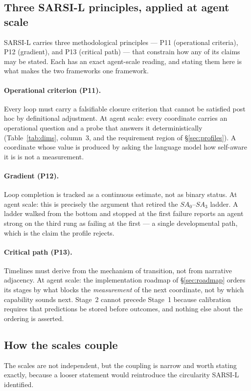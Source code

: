 \documentclass[11pt]{article}
\begin{document}
\subsection{Three SARSI-L principles, applied at agent scale}
\label{sec:principles-applied}
SARSI-L carries three methodological principles --- P11 (operational criteria), P12 (gradient), and P13 (critical path) --- that constrain how any of its claims may be stated. Each has an exact agent-scale reading, and stating them here is what makes the two frameworks one framework.

\paragraph{Operational criterion (P11).} Every loop must carry a falsifiable closure criterion that cannot be satisfied post hoc by definitional adjustment. At agent scale: every coordinate carries an operational question and a probe that answers it deterministically (Table~\ref{tab:dims}, column~3, and the requirement region of \S\ref{sec:profiles}). A coordinate whose value is produced by asking the language model how self-aware it is is not a measurement.

\paragraph{Gradient (P12).} Loop completion is tracked as a continuous estimate, not as binary status. At agent scale: this is precisely the argument that retired the $SA_0$--$SA_3$ ladder. A ladder walked from the bottom and stopped at the first failure reports an agent strong on the third rung as failing at the first --- a single developmental path, which is the claim the profile rejects.

\paragraph{Critical path (P13).} Timelines must derive from the mechanism of transition, not from narrative adjacency. At agent scale: the implementation roadmap of \S\ref{sec:roadmap} orders its stages by what blocks the \emph{measurement} of the next coordinate, not by which capability sounds next. Stage~2 cannot precede Stage~1 because calibration requires that predictions be stored before outcomes, and nothing else about the ordering is asserted.

\subsection{How the scales couple}
The scales are not independent, but the coupling is narrow and worth stating exactly, because a looser statement would reintroduce the circularity SARSI-L identified.
\end{document}

